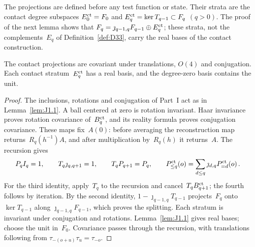 The projections are defined before any test function or state. Their strata are the contact degree subspaces $E_0^{\rm ct}=F_0$ and $E_q^{\rm ct}=\ker T_{q-1}\subset F_q$ $(q>0)$. The proof of the next lemma shows that $F_q=\jmath_{q-1,q}F_{q-1}\oplus E_q^{\rm ct}$; these strata, not the complements~$E_q$ of Definition~\ref{def:D33}, carry the real bases of the contact construction.

\begin{lemma}\label{lem:J2.1}
The contact projections are covariant under translations, $O(4)$ and conjugation. Each contact stratum~$E_q^{\rm ct}$ has a real basis, and the degree-zero basis contains the unit.
\end{lemma}

\begin{proof}
The inclusions, rotations and conjugation of Part~I act as in Lemma~\ref{lem:J1.1}. A ball centered at zero is rotation invariant. Haar invariance proves rotation covariance of~$B_q^{\rm ct}$, and its reality formula proves conjugation covariance. These maps fix~$A(0)$: before averaging the reconstruction map returns~$R_q(h^{-1})A$, and after multiplication by~$R_q(h)$ it returns~$A$. The recursion gives
\begin{equation}\label{eq:J-contact-split}
P_qI_q=1,\qquad T_q\jmath_{q,q+1}=1,\qquad T_qP_{q+1}=P_q,\qquad
P_{\le q}^{\rm ct}(o)=\sum_{d\le q}\jmath_{d,q}P_{=d}^{\rm ct}(o)\,.
\end{equation}
For the third identity, apply~$T_q$ to the recursion and cancel~$T_qB_{q+1}^{\rm ct}$; the fourth follows by iteration. By the second identity, $1-\jmath_{q-1,q}T_{q-1}$ projects~$F_q$ onto $\ker T_{q-1}$ along $\jmath_{q-1,q}F_{q-1}$, which proves the splitting. Each stratum is invariant under conjugation and rotations. Lemma~\ref{lem:J1.1} gives real bases; choose the unit in~$F_0$. Covariance passes through the recursion, with translations following from $\tau_{-(o+u)}\tau_u=\tau_{-o}$.
\end{proof}

